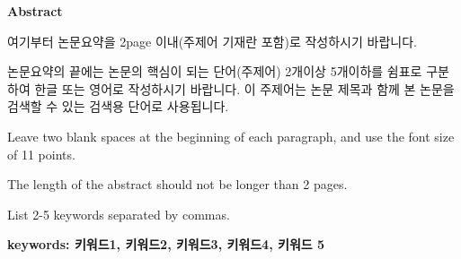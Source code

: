 \fontsize{14pt}{14pt}\selectfont{}\textbf{Abstract}

\setlength{\parskip}{11.5pt}
\fontsize{11pt}{11pt}\selectfont{}\textbf{ }
\setlength{\parskip}{0pt}
\begin{center}
\fontsize{16pt}{16pt}\selectfont{}\textbf{\thesistitle}
\end{center}

\setlength{\parskip}{0pt}
\setlength\parindent{1em}
\fontsize{11pt}{11pt}\selectfont{}
여기부터 논문요약을 2page 이내(주제어 기재란 포함)로 작성하시기 바랍니다.\par
논문요약의 끝에는 논문의 핵심이 되는 단어(주제어) 2개이상 5개이하를 쉼표로
구분하여 한글 또는 영어로 작성하시기 바랍니다. 이 주제어는 논문 제목과 함께 본
논문을 검색할 수 있는 검색용 단어로 사용됩니다.\par
Leave two blank spaces at the beginning of each paragraph, and
use the font size of 11 points.\par
The length of the abstract should not be longer than 2 pages.\par
List 2-5 keywords separated by commas.

\fontsize{11pt}{11pt}\selectfont{}
\textbf{keywords: 키워드1, 키워드2, 키워드3, 키워드4, 키워드 5}